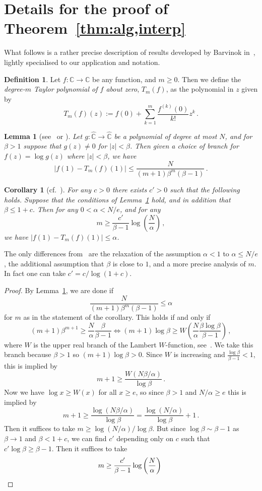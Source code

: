 \documentclass[10pt,a4paper]{article}
\newtheorem{lemma}[theorem]{Lemma}
\newtheorem{corollary}[theorem]{Corollary}
\theoremstyle{definition}
\newtheorem{definition}[theorem]{Definition}
\newcommand*{\CC}{\mathbb{C}}
\newcommand*{\hCC}{\hat{\mathbb{C}}}
\begin{document}
\section{Details for the proof of Theorem~\ref{thm:alg,interp}}\label{app:interp,details}
%
What follows is a rather precise description of results developed by Barvinok in~\cite{Barvinok16,Barvinok18}, lightly specialised to our application and notation.
%
\begin{definition}\label{def:taylor}
Let $f:\CC\to\CC$ be any function, and $m\ge 0$. Then we define the \emph{degree-$m$ Taylor polynomial of $f$ about zero}, $T_m(f)$, as the polynomial in $z$ given by
\[
T_m(f)(z) := f(0) + \sum_{k=1}^m\frac{f^{(k)}(0)}{k!}z^k\,.
\]
\end{definition}
%
\begin{lemma}[{see~\cite[Lemma 2.2.1]{Barvinok16} or \cite[Lemma 2.1]{Barvinok18}}]\label{lem:tayloraccuracy}
Let $g:\hCC\to\hCC$ be a polynomial of degree at most $N$, and for $\beta>1$ suppose that $g(z)\ne 0$ for $|z|<\beta$.
%
Then given a choice of branch for $f(z)=\log g(z)$ where $|z|<\beta$, we have 
\[
|f(1)-T_m(f)(1)| \le \frac{N}{(m+1)\beta^m(\beta-1)}\,.
\]
\end{lemma}
%
\begin{corollary}[{cf.~\cite[Corollary 2.2]{Barvinok18}}]\label{cor:tayloreps}
For any $c>0$ there exists $c'>0$ such that the following holds.
Suppose that the conditions of Lemma~\ref{lem:tayloraccuracy} hold, and in addition that $\beta\le 1+c$. 
%
Then for any $0<\alpha<N/e$, and for any 
\[
m \ge \frac{c'}{\beta-1}\log\left(\frac{N}{\alpha}\right)\,,
\]
we have $|f(1)-T_m(f)(1)|\le \alpha$.
\end{corollary}
%
The only differences from~\cite[Corollary 2.2]{Barvinok18} are the relaxation of the assumption $\alpha<1$ to $\alpha\le N/e$, the additional assumption that $\beta$ is close to $1$, and a more precise analysis of $m$. 
In fact one can take $c'=c/\log(1+c)$.
%
\begin{proof}
By Lemma~\ref{lem:tayloraccuracy}, we are done if 
\[
\frac{N}{(m+1)\beta^m(\beta-1)} \le \alpha
\]
for $m$ as in the statement of the corollary. This holds if and only if
\[
(m+1)\beta^{m+1} \ge \frac{N}{\alpha}\frac{\beta}{\beta-1} \Longleftrightarrow
(m+1)\log\beta \ge W\left(\frac{N}{\alpha}\frac{\beta\log\beta}{\beta-1}\right)\,,
\]
where $W$ is the upper real branch of the Lambert $W$-function, see~\cite{CGHJK96}. We take this branch because $\beta> 1$ so $(m+1)\log\beta > 0$.
Since $W$ is increasing and $\frac{\log \beta}{\beta-1} <1$, this is implied by 
\[
m+1 \ge \frac{W(N\beta/\alpha)}{\log\beta}\,.
\]
Now we have $\log x \ge W(x)$ for all $x\ge e$, so since $\beta>1$ and $N/\alpha \ge e$ this is implied by 
\[
m+1 \ge \frac{\log(N\beta/\alpha)}{\log\beta} = \frac{\log(N/\alpha)}{\log\beta} + 1\,.
\]
Then it suffices to take $m\ge \log(N/\alpha)/\log\beta$. But since $\log\beta\sim\beta-1$ as $\beta\to1$ and $\beta< 1+c$, we can find $c'$ depending only on $c$ such that $c'\log\beta \ge \beta -1$. Then it suffices to take 
\[
m \ge \frac{c'}{\beta-1}\log\left(\frac{N}{\alpha}\right)\,\qedhere
\]
\end{proof}
\end{document}
